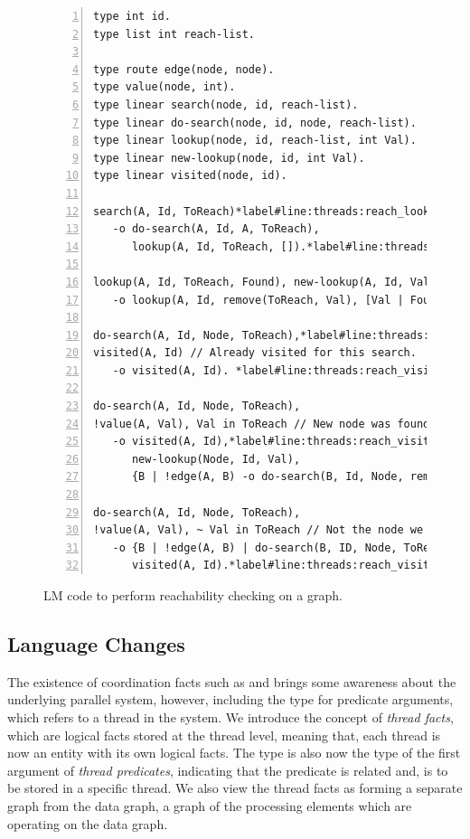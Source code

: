 \begin{figure}[h]
\begin{Verbatim}[numbers=left,fontsize=\codesize,commandchars=*\#\&]
type int id.
type list int reach-list.

type route edge(node, node).
type value(node, int).
type linear search(node, id, reach-list).
type linear do-search(node, id, node, reach-list).
type linear lookup(node, id, reach-list, int Val).
type linear new-lookup(node, id, int Val).
type linear visited(node, id).

search(A, Id, ToReach)*label#line:threads:reach_lookup1&
   -o do-search(A, Id, A, ToReach),
      lookup(A, Id, ToReach, []).*label#line:threads:reach_lookup2&

lookup(A, Id, ToReach, Found), new-lookup(A, Id, Val) // New reachable node found.
   -o lookup(A, Id, remove(ToReach, Val), [Val | Found]).

do-search(A, Id, Node, ToReach),*label#line:threads:reach_visit1&
visited(A, Id) // Already visited for this search.
   -o visited(A, Id). *label#line:threads:reach_visit2&

do-search(A, Id, Node, ToReach),
!value(A, Val), Val in ToReach // New node was found.
   -o visited(A, Id),*label#line:threads:reach_visit_visited1&
      new-lookup(Node, Id, Val),
      {B | !edge(A, B) -o do-search(B, Id, Node, remove(ToReach, Val))}.*label#line:threads:reach_propagate&

do-search(A, Id, Node, ToReach),
!value(A, Val), ~ Val in ToReach // Not the node we are looking for.
   -o {B | !edge(A, B) | do-search(B, ID, Node, ToReach)},*label#line:threads:reach_propagate2&
      visited(A, Id).*label#line:threads:reach_visit_visited2&
\end{Verbatim}

\caption{LM code to perform reachability checking on a graph.}
\label{code:threads:reach_simple}
\end{figure}

\subsection{Language Changes}

The existence of coordination facts such as  and
 brings some awareness about the underlying parallel system,
however, including the type  for predicate arguments, which refers
to a thread in the system. We introduce the concept of \emph{thread facts},
which are logical facts stored at the thread level, meaning that, each thread
is now an entity with its own logical facts. The type  is also now
the type of the first argument of \emph{thread predicates}, indicating that the
predicate is related and, is to be stored in a specific thread. We also view
the thread facts as forming a separate graph from the data graph, a graph of
the processing elements which are operating on the data graph.


